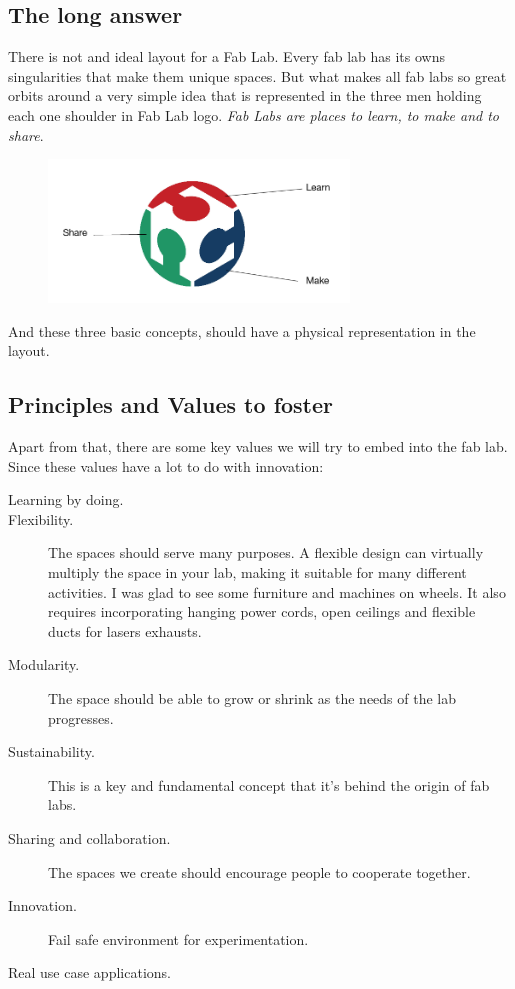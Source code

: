 \documentclass[a4paper,12pt,titlepage]{article}
\begin{document}
\subsection{The long answer}
There is not and ideal layout for a Fab Lab. Every fab lab has its owns singularities that make
them unique spaces. But what makes all fab labs so great orbits around a very simple idea that
is represented in the three men holding each one shoulder in Fab Lab logo. \textit{Fab Labs are
places to learn, to make and to share}. 

\begin{figure}[h] %
   \centering
   \includegraphics[width=8cm]{files/learn-make-share} 
\end{figure}

And these three basic concepts, should have a physical representation in the layout. 

\subsection{Principles and Values to foster}
Apart from that, there are some key values we will try to embed into the fab lab.
Since these values have a lot to do with innovation:

\begin{description}
\item[Learning by doing.]
\item[Flexibility.] The spaces should serve many purposes. A flexible design can virtually multiply
the space in your lab, making it suitable for many different activities. I was glad to see some
furniture and machines on wheels. It also requires incorporating hanging power cords, open
ceilings and flexible ducts for lasers exhausts.
\item[Modularity.] The space should be able to grow or shrink as the needs of the lab progresses.
\item[Sustainability.] This is a key and fundamental concept that it's behind the origin of fab labs.
\item[Sharing and collaboration.] The spaces we create should encourage people to cooperate together.
\item[Innovation.] Fail safe environment for experimentation.
\item[Real use case applications.]
\end{description}
\end{document}
